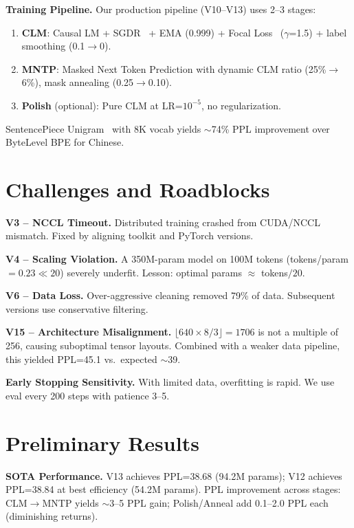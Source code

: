 \documentclass[10pt,a4paper]{ctexart}
\begin{document}
\textbf{Training Pipeline.} Our production pipeline (V10--V13) uses 2--3 stages:
\begin{enumerate}[nosep]
    \item \textbf{CLM}: Causal LM + SGDR~\cite{loshchilov2016sgdr} + EMA (0.999) + Focal Loss~\cite{lin2017focal} ($\gamma$=1.5) + label smoothing (0.1$\to$0).
    \item \textbf{MNTP}: Masked Next Token Prediction with dynamic CLM ratio (25\%$\to$6\%), mask annealing (0.25$\to$0.10).
    \item \textbf{Polish} (optional): Pure CLM at LR=$10^{-5}$, no regularization.
\end{enumerate}
SentencePiece Unigram~\cite{kudo2018sentencepiece} with 8K vocab yields $\sim$74\% PPL improvement over ByteLevel BPE for Chinese.

\section{Challenges and Roadblocks}

\textbf{V3 -- NCCL Timeout.} Distributed training crashed from CUDA/NCCL mismatch. Fixed by aligning toolkit and PyTorch versions.

\textbf{V4 -- Scaling Violation.} A 350M-param model on 100M tokens (tokens/param$=0.23 \ll 20$) severely underfit. Lesson: optimal params $\approx$ tokens$/20$.

\textbf{V6 -- Data Loss.} Over-aggressive cleaning removed 79\% of data. Subsequent versions use conservative filtering.

\textbf{V15 -- Architecture Misalignment.} $\lfloor 640 \times 8/3 \rfloor = 1706$ is not a multiple of 256, causing suboptimal tensor layouts. Combined with a weaker data pipeline, this yielded PPL=45.1 vs.\ expected $\sim$39.

\textbf{Early Stopping Sensitivity.} With limited data, overfitting is rapid. We use eval every 200 steps with patience 3--5.

\section{Preliminary Results}

\textbf{SOTA Performance.} V13 achieves PPL=38.68 (94.2M params); V12 achieves PPL=38.84 at best efficiency (54.2M params). PPL improvement across stages: CLM$\to$MNTP yields $\sim$3--5 PPL gain; Polish/Anneal add 0.1--2.0 PPL each (diminishing returns).
\end{document}
